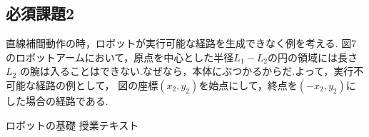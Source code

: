 \documentclass[10pt,a4j]{jsarticle}
\begin{document}
\subsection{必須課題2}
  直線補間動作の時，ロボットが実行可能な経路を生成できなく例を考える.
  図7のロボットアームにおいて，原点を中心とした半径$L_{1} - L_{2}$の円の領域には長さ$L_{2}$
  の腕は入ることはできない.なぜなら，本体にぶつかるからだ.よって，実行不可能な経路の例として，
  図の座標$(x_{2}, y_{2})$を始点にして，終点を$(-x_{2}, y_{2})$にした場合の経路である.

\begin{thebibliography}{3}
\bibitem{}ロボットの基礎 授業テキスト
\end{thebibliography}
\end{document}
